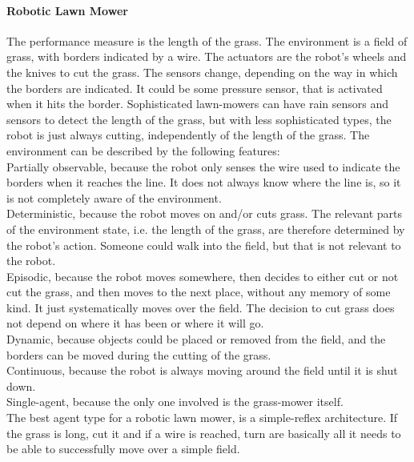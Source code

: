 \documentclass{article}
\begin{document}
	\paragraph{Robotic Lawn Mower}
	The performance measure is the length of the grass. The environment is a field of grass, with borders indicated by a wire. The actuators are the robot's wheels and the knives to cut the grass. The sensors change, depending on the way in which the borders are indicated. It could be some pressure sensor, that is activated when it hits the border. Sophisticated lawn-mowers can have rain sensors and sensors to detect the length of the grass, but with less sophisticated types, the robot is just always cutting, independently of the length of the grass. The environment can be described by the following features: \\
	Partially observable, because the robot only senses the wire used to indicate the borders when it reaches the line. It does not always know where the line is, so it is not completely aware of the environment. \\
	Deterministic, because the robot moves on and/or cuts grass. The relevant parts of the environment state, i.e. the length of the grass, are therefore determined by the robot's action. Someone could walk into the field, but that is not relevant to the robot. \\
	Episodic, because the robot moves somewhere, then decides to either cut or not cut the grass, and then moves to the next place, without any memory of some kind. It just systematically moves over the field. The decision to cut grass does not depend on where it has been or where it will go. \\
	Dynamic, because objects could be placed or removed from the field, and the borders can be moved during the cutting of the grass. \\
	Continuous, because the robot is always moving around the field until it is shut down. \\
	Single-agent, because the only one involved is the grass-mower itself.\\
	The best agent type for a robotic lawn mower, is a simple-reflex architecture. If the grass is long, cut it and if a wire is reached, turn are basically all it needs to be able to successfully move over a simple field.
\end{document}
